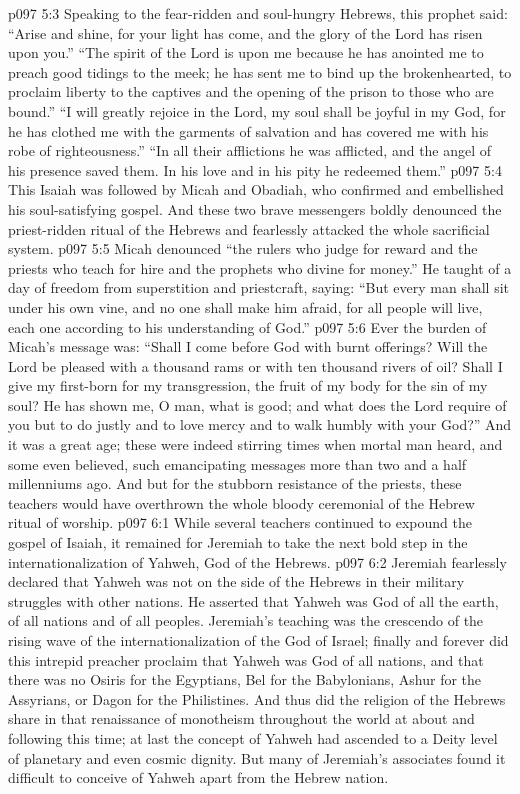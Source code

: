 \vs p097 5:3 Speaking to the fear\hyp{}ridden and soul\hyp{}hungry Hebrews, this prophet said: “Arise and shine, for your light has come, and the glory of the Lord has risen upon you.” “The spirit of the Lord is upon me because he has anointed me to preach good tidings to the meek; he has sent me to bind up the brokenhearted, to proclaim liberty to the captives and the opening of the prison to those who are bound.” “I will greatly rejoice in the Lord, my soul shall be joyful in my God, for he has clothed me with the garments of salvation and has covered me with his robe of righteousness.” “In all their afflictions he was afflicted, and the angel of his presence saved them. In his love and in his pity he redeemed them.”
\pc \vs p097 5:4 This Isaiah was followed by Micah and Obadiah, who confirmed and embellished his soul\hyp{}satisfying gospel. And these two brave messengers boldly denounced the priest\hyp{}ridden ritual of the Hebrews and fearlessly attacked the whole sacrificial system.
\vs p097 5:5 Micah denounced “the rulers who judge for reward and the priests who teach for hire and the prophets who divine for money.” He taught of a day of freedom from superstition and priestcraft, saying: “But every man shall sit under his own vine, and no one shall make him afraid, for all people will live, each one according to his understanding of God.”
\vs p097 5:6 Ever the burden of Micah’s message was: “Shall I come before God with burnt offerings? Will the Lord be pleased with a thousand rams or with ten thousand rivers of oil? Shall I give my first\hyp{}born for my transgression, the fruit of my body for the sin of my soul? He has shown me, O man, what is good; and what does the Lord require of you but to do justly and to love mercy and to walk humbly with your God?” And it was a great age; these were indeed stirring times when mortal man heard, and some even believed, such emancipating messages more than two and a half millenniums ago. And but for the stubborn resistance of the priests, these teachers would have overthrown the whole bloody ceremonial of the Hebrew ritual of worship.
\vs p097 6:1 While several teachers continued to expound the gospel of Isaiah, it remained for Jeremiah to take the next bold step in the internationalization of Yahweh, God of the Hebrews.
\vs p097 6:2 Jeremiah fearlessly declared that Yahweh was not on the side of the Hebrews in their military struggles with other nations. He asserted that Yahweh was God of all the earth, of all nations and of all peoples. Jeremiah’s teaching was the crescendo of the rising wave of the internationalization of the God of Israel; finally and forever did this intrepid preacher proclaim that Yahweh was God of all nations, and that there was no Osiris for the Egyptians, Bel for the Babylonians, Ashur for the Assyrians, or Dagon for the Philistines. And thus did the religion of the Hebrews share in that renaissance of monotheism throughout the world at about and following this time; at last the concept of Yahweh had ascended to a Deity level of planetary and even cosmic dignity. But many of Jeremiah’s associates found it difficult to conceive of Yahweh apart from the Hebrew nation.\plusone
